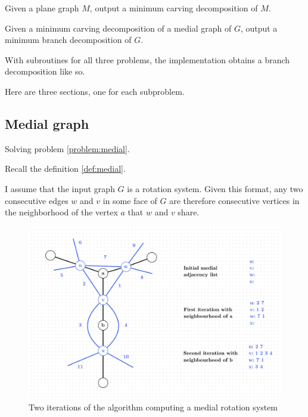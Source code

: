 \documentclass{article}
\begin{document}
	\begin{problem}\label{problem:mcd}
		Given a plane graph $M$, output a minimum carving decomposition of $M$.
	\end{problem}

	\begin{problem}\label{problem:mcd-to-mbd}
		Given a minimum carving decomposition of a medial graph of $G$, output a minimum branch decomposition of $G$.
	\end{problem}

	With subroutines for all three problems, the implementation obtains a branch decomposition like so.


	Here are three sections, one for each subproblem.

	\subsection{Medial graph}

		Solving problem \ref{problem:medial}.

		Recall the definition \ref{def:medial}.

		I assume that the input graph $G$ is a rotation system. Given this format, any two consecutive edges $w$ and $v$ in some face of $G$ are therefore consecutive vertices in the neighborhood of the vertex $a$ that $w$ and $v$ share.

		\begin{figure}[H]
			\centering
			\includegraphics[width=\textwidth]{./images/medial-implementation-4-reg-argument.png}
			\caption{Two iterations of the algorithm computing a medial rotation system}
			\label{fig:overview}
		\end{figure}
		
\end{document}
